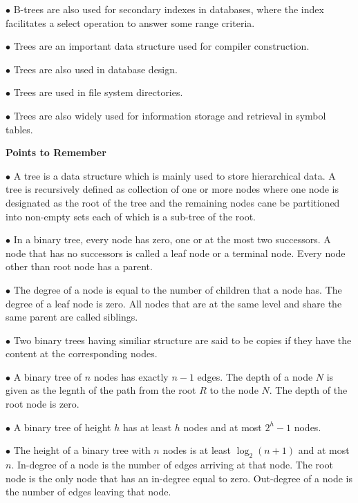 \vskip 3mm
\qquad$\bullet$ B-trees are also used for secondary indexes in databases, where the index facilitates a select operation to answer some range criteria.

\vskip 3mm
\qquad$\bullet$ Trees are an important data structure used for compiler construction.

\vskip 3mm
\qquad$\bullet$ Trees are also used in database design.

\vskip 3mm
\qquad$\bullet$ Trees are used in file system directories.

\vskip 3mm
\qquad$\bullet$ Trees are also widely used for information storage and retrieval in symbol tables.

\filbreak
\vskip 1cm
{\bf Points to Remember}

\vskip 3mm
\qquad$\bullet$ A tree is a data structure which is mainly used to store hierarchical data. A tree is recursively defined as collection of one or more nodes where one node is designated as the root of the tree and the remaining nodes cane be partitioned into non-empty sets each of which is a sub-tree of the root.

\vskip 3mm
\qquad$\bullet$ In a binary tree, every node has zero, one or at the most two successors. A node that has no successors is called a leaf node or a terminal node. Every node other than root node has a parent.

\vskip 3mm
\qquad$\bullet$ The degree of a node is equal to the number of children that a node has. The degree of a leaf node is zero. All nodes that are at the same level and share the same parent are called siblings.

\vskip 3mm
\qquad$\bullet$ Two binary trees having similiar structure are said to be copies if they have the content at the corresponding nodes.

\vskip 3mm
\qquad$\bullet$ A binary tree of $n$ nodes has exactly $n-1$ edges. The depth of a node $N$ is given as the legnth of the path from the root $R$ to the node $N$. The depth of the root node is zero.

\vskip 3mm
\qquad$\bullet$ A binary tree of height $h$ has at least $h$ nodes and at most $2^h-1$ nodes.

\vskip 3mm
\qquad$\bullet$ The height of a binary tree with $n$ nodes is at least $\log_2(n+1)$ and at most $n$. In-degree of a node is the number of edges arriving at that node. The root node is the only node that has an in-degree equal to zero. Out-degree of a node is the number of edges leaving that node.

